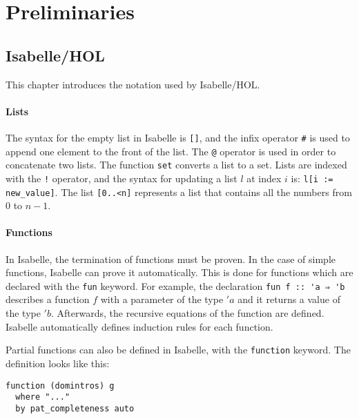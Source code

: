 
\chapter{Preliminaries}\label{chapter:preliminaries}

\section{Isabelle/HOL}

 This chapter introduces the notation used by Isabelle/HOL.

\subsubsection{Lists}

The syntax for the empty list in Isabelle is \lstinline|[]|, and the infix operator \lstinline|#| is used to append one element to the front of the list.
The \lstinline|@| operator is used in order to concatenate two lists.
The function \lstinline|set| converts a list to a set.
Lists are indexed with the \lstinline|!| operator, and the syntax for updating a list $l$ at index $i$ is: \lstinline|l[i := new_value]|. The list \lstinline|[0..<n]| represents a list that contains all the numbers from $0$ to $n-1$.

\subsubsection{Functions}

In Isabelle, the termination of functions must be proven.
In the case of simple functions, Isabelle can prove it automatically.
This is done for functions which are declared with the \lstinline{fun} keyword.
For example, the declaration \lstinline|fun f :: 'a ⇒ 'b| describes a function $f$ with a parameter of the type $'a$ and it returns a value of the type $'b$.
Afterwards, the recursive equations of the function are defined.
Isabelle automatically defines induction rules for each function.

Partial functions can also be defined in Isabelle, with the \lstinline{function} keyword.
The definition looks like this:

\begin{lstlisting}
function (domintros) g
  where "..."
  by pat_completeness auto
\end{lstlisting}

